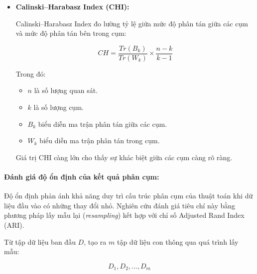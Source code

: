 \documentclass[12pt]{ai_conquer2026}
\begin{document}
\begin{itemize}
\begin{itemize}
    \item $k$ là số lượng cụm.
    \item $S_i$ và $S_j$ là độ phân tán của cụm $i$ và cụm $j$.
    \item $M_{ij}$ là khoảng cách giữa tâm của hai cụm $i$ và $j$.
\end{itemize}

Giá trị DBI càng nhỏ thể hiện các cụm càng khác biệt và mô hình có chất lượng phân cụm tốt hơn.


\item \textbf{Calinski--Harabasz Index (CHI):}

Calinski--Harabasz Index đo lường tỷ lệ giữa mức độ phân tán giữa các cụm và mức độ phân tán bên trong cụm:

\begin{equation}
CH=
\frac{Tr(B_k)}
{Tr(W_k)}
\times
\frac{n-k}{k-1}
\end{equation}

Trong đó:

\begin{itemize}
    \item $n$ là số lượng quan sát.
    \item $k$ là số lượng cụm.
    \item $B_k$ biểu diễn ma trận phân tán giữa các cụm.
    \item $W_k$ biểu diễn ma trận phân tán trong cụm.
\end{itemize}

Giá trị CHI càng lớn cho thấy sự khác biệt giữa các cụm càng rõ ràng.

\end{itemize}


\paragraph{Đánh giá độ ổn định của kết quả phân cụm:}

Độ ổn định phản ánh khả năng duy trì cấu trúc phân cụm của thuật toán khi dữ liệu đầu vào có những thay đổi nhỏ. Nghiên cứu đánh giá tiêu chí này bằng phương pháp lấy mẫu lại (\textit{resampling}) kết hợp với chỉ số Adjusted Rand Index (ARI).

Từ tập dữ liệu ban đầu $D$, tạo ra $m$ tập dữ liệu con thông qua quá trình lấy mẫu:

\begin{equation}
D_1,D_2,...,D_m
\end{equation}
\end{document}
